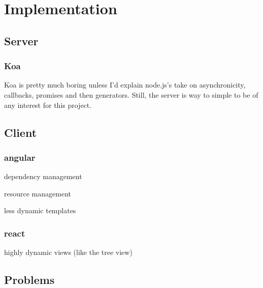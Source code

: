 
\section{Implementation}
\label{implementation}

\subsection{Server}
\label{used-tech}

\subsubsection{Koa}
\label{koa}

Koa is pretty much boring unless I'd explain
node.js's take on asynchronicity, callbacks, promises and then
generators. Still, the server is way to simple to be of any interest for
this project.

\subsection{Client}
\label{used-tech}

\subsubsection{angular}
\label{angular}

\begin{itemize*}
  \item dependency management
  \item resource management
  \item less dynamic templates
\end{itemize*}

\subsubsection{react}
\label{react}

\begin{itemize*}
  \item highly dynamic views (like the tree view)
\end{itemize*}

\subsection{Problems}
\label{problems}

